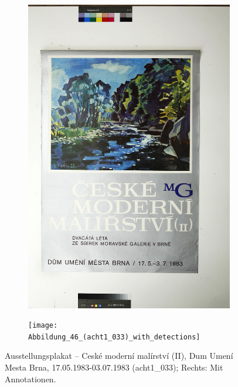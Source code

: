 \documentclass[a4paper,12pt,ngerman]{article}
\begin{document}
\newpage
\begin{landscape}
\begin{figure}[ht]
	\begin{subfigure}[b]{0.5\linewidth}
	\centering
	\includegraphics[height=\linewidth]{Abbildung_50_(acht1_033)}
	\end{subfigure}
	\begin{subfigure}[b]{0.5\linewidth}
	\centering
	\texttt{[image: Abbildung\_46\_(acht1\_033)\_with\_detections]}
	\end{subfigure}
	\caption{Ausstellungsplakat – Ceské moderní malírství (II), Dum Umení Mesta Brna, 17.05.1983-03.07.1983 (acht1\_033); Rechts: Mit Annotationen.}
\end{figure}
\end{landscape}
\end{document}
